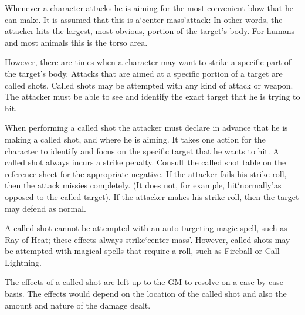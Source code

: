 \documentclass[twoside]{book}
\begin{document}
    {  
    Whenever a character attacks he is aiming for the most convenient blow that he can make. It is assumed that this is a`center mass'attack: In other words, the attacker hits the largest, most obvious, portion of the target's body. For humans and most animals this is the torso area.
    }
  
    {  
    However, there are times when a character may want to strike a specific part of the target's body. Attacks that are aimed at a specific portion of a target are called shots. Called shots may be attempted with any kind of attack or weapon. The attacker must be able to see and identify the exact target that he is trying to hit.
    }
  
    {  
    When performing a called shot the attacker must declare in advance that he is making a called shot, and where he is aiming. It takes one action for the character to identify and focus on the specific target that he wants to hit. A called shot always incurs a strike penalty. Consult the called shot table on the reference sheet for the appropriate negative. If the attacker fails his strike roll, then the attack missies completely. (It does not, for example, hit`normally'as opposed to the called target). If the attacker makes his strike roll, then the target may defend as normal.
    }
  
    {  
    A called shot cannot be attempted with an auto-targeting magic spell, such as Ray of Heat; these effects always strike`center mass'. However, called shots may be attempted with magical spells that require a roll, such as Fireball or Call Lightning.
    }
  
    {  
    The effects of a called shot are left up to the GM to resolve on a case-by-case basis. The effects would depend on the location of the called shot and also the amount and nature of the damage dealt.
    }
  
  

  

  
  

  
\end{document}
